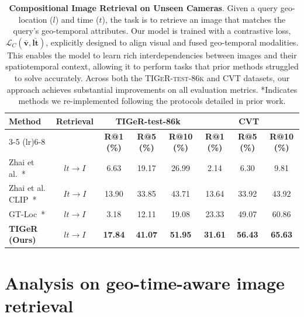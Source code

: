 \begin{table}[h]
    \centering
    \setlength{\tabcolsep}{2pt}
    \renewcommand{\arraystretch}{1.0}
    \caption{\textbf{Compositional Image Retrieval on Unseen Cameras}. Given a query geo-location ($l$) and time ($t$), the task is to retrieve an image that matches the query’s geo-temporal attributes. Our model is trained with a contrastive loss, $\mathcal{L}_C(\bar{\mathbf{v}}, \bar{\mathbf{lt}})$, explicitly designed to align visual and fused geo-temporal modalities. This enables the model to learn rich interdependencies between images and their spatiotemporal context, allowing it to perform tasks that prior methods struggled to solve accurately. Across both the \textsc{TIGeR-test-86k} and CVT datasets, our approach achieves substantial improvements on all evaluation metrics. *Indicates methods we re-implemented following the protocols detailed in prior work.}

    \label{tab:composite-img-ret}
    \begin{tabular}{lccccccc} 
        \toprule
        \multirow{2}{*}{\textbf{Method}} & \multirow{2}{*}{\textbf{Retrieval}} & \multicolumn{3}{c}{\textbf{TIGeR-test-86k}} & \multicolumn{3}{c}{\textbf{CVT}} \\
        \cmidrule(lr){3-5} \cmidrule(lr){6-8}  
        &  &\textbf{R@1 (\%)} & \textbf{R@5 (\%)} & \textbf{R@10 (\%)} & \textbf{R@1 (\%)} & \textbf{R@5 (\%)} & \textbf{R@10 (\%)} \\
        
        \midrule
        
        Zhai et al.~\cite{zhai2019learning}* & $lt \rightarrow I$ & 6.63 & 19.17 & 26.99 & 2.14 & 6.30 & 9.81 \\
        Zhai et al. CLIP~\cite{zhai2019learning}* & $It \rightarrow I$ & 13.90 & 33.85 & 43.71 & 13.64 & 33.92 & 43.92 \\
        GT-Loc~\cite{Shatwell_2025_ICCV}* & $lt \rightarrow I$ & 3.18 & 12.11 & 19.08 & 23.33 & 49.07 & 60.86 \\
        \midrule
        \textbf{TIGeR (Ours)} & $lt \rightarrow I$ & \textbf{17.84} & \textbf{41.07} & \textbf{51.95} & \textbf{31.61} & \textbf{56.43} & \textbf{65.63} \\

        \bottomrule
    \end{tabular}
\end{table}

\section{Analysis on geo-time-aware image retrieval}
\label{sup:gt-cond-img-ret}

